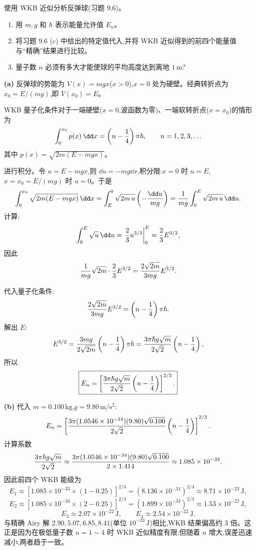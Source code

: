 \begin{question}
使用 WKB 近似分析反弹球(习题 9.6)。
\begin{enumerate}
\item 用 $m,g$ 和 $\hbar$ 表示能量允许值 $E_n$。
\item 将习题 9.6 (c) 中给出的特定值代入,并将 WKB 近似得到的前四个能量值与“精确”结果进行比较。
\item 量子数 $n$ 必须有多大才能使球的平均高度达到离地 $1\,\mathrm{m}$?
\end{enumerate}
\begin{solution}
\textbf{(a)} 反弹球的势能为 $V(x)=mgx$($x>0$),$x=0$ 处为硬壁。经典转折点为 $x_0=E/(mg)$,即 $V(x_0)=E$。

WKB 量子化条件对于一端硬壁($x=0$,波函数为零)、一端软转折点($x=x_0$)的情形为
\[
\int_0^{x_0}p(x)\,\dd x=\left(n-{1\over4}\right)\pi\hbar,
\qquad n=1,2,3,\ldots
\]
其中 $p(x)=\sqrt{2m(E-mgx)}$。

进行积分。令 $u=E-mgx$,则 $\dd u=-mg\dd x$,积分限:$x=0$ 时 $u=E$,$x=x_0=E/(mg)$ 时 $u=0$。于是
\[
\int_0^{x_0}\sqrt{2m(E-mgx)}\,\dd x
=\int_E^0\sqrt{2m\,u}\left(-{\dd u\over mg}\right)
={1\over mg}\int_0^E\sqrt{2m\,u}\,\dd u.
\]
计算:
\[
\int_0^E\sqrt{u}\,\dd u=\left.{2\over3}u^{3/2}\right|_0^E={2\over3}E^{3/2},
\]
因此
\[
{1\over mg}\sqrt{2m}\cdot{2\over3}E^{3/2}
={2\sqrt{2m}\over3mg}E^{3/2}.
\]

代入量子化条件:
\[
{2\sqrt{2m}\over3mg}E^{3/2}=\left(n-{1\over4}\right)\pi\hbar.
\]
解出 $E$:
\[
E^{3/2}={3mg\over2\sqrt{2m}}\left(n-{1\over4}\right)\pi\hbar
={3\pi\hbar g\sqrt m\over2\sqrt2}\left(n-{1\over4}\right),
\]
所以
\[
\boxed{E_n=\left[{3\pi\hbar g\sqrt m\over2\sqrt2}\left(n-{1\over4}\right)\right]^{2/3}.}
\]

\textbf{(b)} 代入 $m=0.100\,\mathrm{kg}$,$g=9.80\,\mathrm{m/s^2}$:
\[
E_n=\left[{3\pi(1.0546\times10^{-34})(9.80)\sqrt{0.100}\over2\sqrt2}
\left(n-{1\over4}\right)\right]^{2/3}.
\]
计算系数
\[
{3\pi\hbar g\sqrt m\over2\sqrt2}
\approx{3\pi(1.0546\times10^{-34})(9.80)\sqrt{0.100}\over2\times1.414}
\approx 1.085\times10^{-33}.
\]
因此前四个 WKB 能级为
\[
E_1\approx\left[1.085\times10^{-33}\times(1-0.25)\right]^{2/3}
=\left(8.136\times10^{-34}\right)^{2/3}\approx 8.71\times10^{-23}\,\mathrm{J},
\]
\[
E_2\approx\left[1.085\times10^{-33}\times(2-0.25)\right]^{2/3}
=\left(1.899\times10^{-33}\right)^{2/3}\approx 1.53\times10^{-22}\,\mathrm{J},
\]
\[
E_3\approx 2.07\times10^{-22}\,\mathrm{J},\qquad
E_4\approx 2.54\times10^{-22}\,\mathrm{J}.
\]
与精确 Airy 解 $2.90,5.07,6.85,8.41$(单位 $10^{-23}\,\mathrm{J}$)相比,WKB 结果偏高约 $3$ 倍。这正是因为在极低量子数 $n=1\sim4$ 时 WKB 近似精度有限;但随着 $n$ 增大,误差迅速减小,两者趋于一致。


\end{solution}
\end{question}
